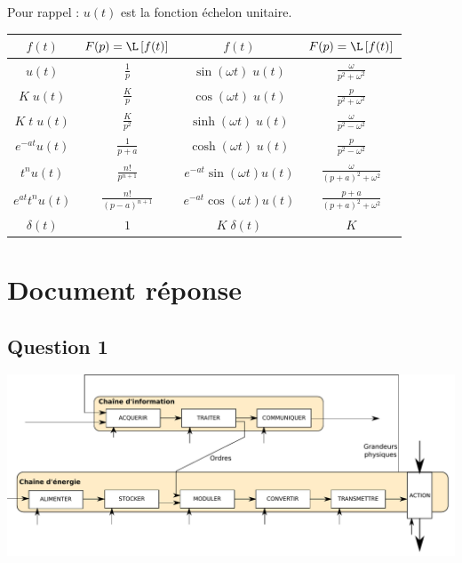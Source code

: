 Pour rappel : $u(t)$ est la fonction échelon unitaire.
\renewcommand\arraystretch{1.3}
\begin{center}
\begin{tabular}{|c|c||c|c|}
	\hline
	$f(t)$			&	$\displaystyle F(p)=\L\left[f(t)\right]$		&	$f(t)$					&	$F(p)=\L\left[f(t)\right]$					\\[0.3cm]
	\hline\hline
	$u(t)$			&	$\displaystyle \frac 1p$				&	$\sin(\omega t)\;u(t)$		&	$\displaystyle \frac{\omega}{p^2+\omega^2}$	\\[0.3cm]
	\hline
	$K\;u(t)$		&	$\displaystyle \frac{K}{p}$			&	$\cos(\omega t)\;u(t)$		&	$\displaystyle \frac{p}{p^2+\omega^2}$		\\[0.3cm]
	\hline
	$K\;t\;u(t)$		&	$\displaystyle \frac K{p^2}$			&	$\sinh(\omega t)\;u(t)$		&	$\displaystyle \frac \omega{p^2-\omega^2}$		\\[0.3cm]
	\hline
	$e^{-at}u(t)$	&	$\displaystyle \frac{1}{p+a}$			&	$\cosh(\omega t)\;u(t)$		&	$\displaystyle \frac{p}{p^2-\omega^2}$		\\[0.3cm]
	\hline
	$t^nu(t)$		&	$\displaystyle \frac{n!}{p^{n+1}}$		&	$e^{-at}\sin(\omega t)u(t)$	&	$\displaystyle \frac \omega{(p+a)^2+\omega^2}$	\\[0.3cm]
	\hline
	$e^{at} t^n u(t)$	&	$\displaystyle \frac{n!}{(p-a)^{n+1}}$		&	$e^{-at}\cos(\omega t) u(t)$	&	$\displaystyle \frac{p+a}{(p+a)^2+\omega^2}$	\\[0.3cm]
	\hline
	$\delta(t)$		&	$1$							&	$K\;\delta(t)$			&	$K$								\\[0.3cm]
	\hline
\end{tabular}
\end{center}

\newpage
\clearpage
\newpage


\setcounter{page}{1}
\section*{Document réponse}

\subsection*{Question 1}
\begin{center}
\includegraphics[width=1.0\textwidth]{images/chaine_fonctionnelle_0.pdf}
\end{center}


